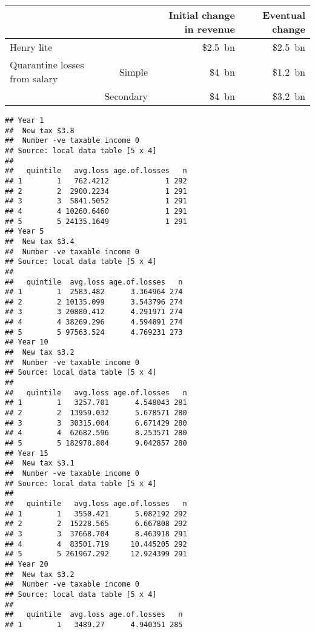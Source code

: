 \documentclass{grattan}\usepackage[]{graphicx}\usepackage[]{color}
\makeatletter
\newenvironment{kframe}{%
 \def\at@end@of@kframe{}%
 \ifinner\ifhmode%
  \def\at@end@of@kframe{\end{minipage}}%
  \begin{minipage}{\columnwidth}%
 \fi\fi%
 \def\FrameCommand##1{\hskip\@totalleftmargin \hskip-\fboxsep
 \colorbox{shadecolor}{##1}\hskip-\fboxsep
     \hskip-\linewidth \hskip-\@totalleftmargin \hskip\columnwidth}%
 \MakeFramed {\advance\hsize-\width
   \@totalleftmargin\z@ \linewidth\hsize
   \@setminipage}}%
 {\par\unskip\endMakeFramed%
 \at@end@of@kframe}
\newenvironment{knitrout}{}{} %
\makeatother
\begin{document}
\begin{table*}
\begin{tabular}{lrrr}
 & & Initial change in revenue & Eventual change \\
 \hline
 Henry lite & & \$2.5~bn & \$2.5~bn\\[4pt]
 Quarantine losses from salary & Simple & \$4~bn & \$1.2~bn \\
                            & Secondary & \$4~bn & \$3.2~bn
\end{tabular}
\end{table*}




\begin{knitrout}
\color{fgcolor}\begin{kframe}
\begin{verbatim}
## Year 1 
##  New tax $3.8 
##  Number -ve taxable income 0 
## Source: local data table [5 x 4]
## 
##   quintile   avg.loss age.of.losses   n
## 1        1   762.4212             1 292
## 2        2  2900.2234             1 291
## 3        3  5841.5052             1 291
## 4        4 10260.6460             1 291
## 5        5 24135.1649             1 291
## Year 5 
##  New tax $3.4 
##  Number -ve taxable income 0 
## Source: local data table [5 x 4]
## 
##   quintile  avg.loss age.of.losses   n
## 1        1  2583.482      3.364964 274
## 2        2 10135.099      3.543796 274
## 3        3 20880.412      4.291971 274
## 4        4 38269.296      4.594891 274
## 5        5 97563.524      4.769231 273
## Year 10 
##  New tax $3.2 
##  Number -ve taxable income 0 
## Source: local data table [5 x 4]
## 
##   quintile   avg.loss age.of.losses   n
## 1        1   3257.701      4.548043 281
## 2        2  13959.032      5.678571 280
## 3        3  30315.004      6.671429 280
## 4        4  62682.596      8.253571 280
## 5        5 182978.804      9.042857 280
## Year 15 
##  New tax $3.1 
##  Number -ve taxable income 0 
## Source: local data table [5 x 4]
## 
##   quintile   avg.loss age.of.losses   n
## 1        1   3550.421      5.082192 292
## 2        2  15228.565      6.667808 292
## 3        3  37668.704      8.463918 291
## 4        4  83501.719     10.445205 292
## 5        5 261967.292     12.924399 291
## Year 20 
##  New tax $3.2 
##  Number -ve taxable income 0 
## Source: local data table [5 x 4]
## 
##   quintile  avg.loss age.of.losses   n
## 1        1   3489.27      4.940351 285

\end{verbatim}
\end{kframe}
\end{knitrout}
\end{document}
